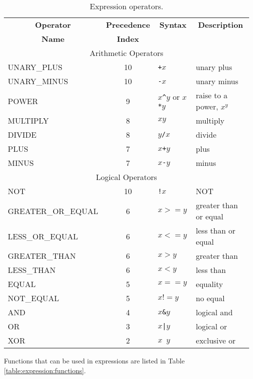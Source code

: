 \begin{table}
\caption{Expression operators.\label{table:expression:operators}}
\begin{center}
\begin{tabular}{|l|c|l|l|}
\hline
\multicolumn{1}{|c}{\bf Operator } &
\multicolumn{1}{|c}{\bf Precedence} &
\multicolumn{1}{|c}{\bf Syntax } &
\multicolumn{1}{|c|}{\bf Description}  \\
\multicolumn{1}{|c}{\bf  Name } &
\multicolumn{1}{|c}{\bf  Index } &
\multicolumn{1}{|c}{} &
\multicolumn{1}{|c|}{} \\
\hline
\hline
\multicolumn{4}{|c|}{Arithmetic Operators} \\
UNARY\_PLUS	& 10& {\tt +}$x$            	& unary plus \\
UNARY\_MINUS	& 10& {\tt -}$x$            	& unary minus \\
POWER		& 9 & $x${\tt \^{}}$y$  or
                  $x${\tt **}$y$ 		& raise to a power, $x^y$ \\
MULTIPLY	& 8 & $x${\tt *}$y$		& multiply \\
DIVIDE		& 8 & $y${\tt /}$x$	        & divide \\
PLUS		& 7 & $x${\tt +}$y$		& plus \\
MINUS		& 7 & $x${\tt -}$y$		& minus \\
\hline
\hline
\multicolumn{4}{|c|}{Logical Operators} \\
\hline
NOT		& 10& {\tt !}$x$		& NOT \\
GREATER\_OR\_EQUAL& 6 & $x>=y$			& greater than or equal \\
LESS\_OR\_EQUAL	& 6 & $x<=y$			& less than or equal \\
GREATER\_THAN	& 6 & $x>y$			& greater than \\
LESS\_THAN	& 6 & $x<y$			& less than \\
EQUAL		& 5 & $x==y$			& equality \\
NOT\_EQUAL	& 5 & $x!=y$			& no equal \\
AND		& 4 & $x${\tt \&}$y$           	& logical and \\
OR		& 3 & $x${\tt |}$y$           	& logical or \\
XOR		& 2 & $x${\tt ~}$y$		& exclusive or \\
\hline
\end{tabular}
\end{center}
\end{table}

Functions that can be used in expressions are listed in Table
\ref{table:expression:functions}. 

